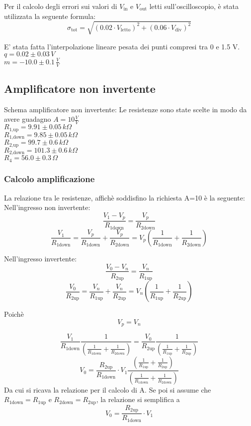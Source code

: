 Per il calcolo degli errori sui valori di $V_\textrm{in}$ e $V_\textrm{out}$ letti sull'oscilloscopio, è stata utilizzata la seguente formula:
$$\sigma_\textrm{tot}=\sqrt{ (0.02\cdot V_\textrm{letto})^2 + (0.06 \cdot V_\textrm{div})^2}$$

E' stata fatta l'interpolazione lineare pesata dei punti compresi tra 0 e 1.5 V.\\
$q = 0.02 \pm 0.03 \,V$\\
$m = -10.0 \pm 0.1 \, \frac{V}{V}$




\subsection{Amplificatore non invertente}

Schema amplificatore non invertente:
Le resistenze sono state scelte in modo da avere guadagno $A=10 \frac{V}{V}$\\
$R_\textrm{1,up}=9.91 \pm0.05 \,k\Omega $\\ %
$R_\textrm{1,down}=9.85 \pm 0.05\,k\Omega$\\ %
$R_\textrm{2,up}=99.7 \pm 0.6\,k\Omega$\\ %
$R_\textrm{2,down}=101.3 \pm 0.6\,k\Omega$\\
$R_4=56.0 \pm 0.3\,\Omega$

\subsubsection{Calcolo amplificazione}
La relazione tra le resistenze, affichè soddisfino la richiesta A=10 è la seguente:
Nell'ingresso non invertente:
$$\frac{V_1-V_p}{R_\textrm{1down}}=\frac{V_p}{R_\textrm{2down}}$$
$$\frac{V_1}{R_\textrm{1down}}=\frac{V_p}{R_\textrm{1down}}+\frac{V_p}{R_\textrm{2down}}=V_p \left(\frac{1}{R_\textrm{1down}}+\frac{1}{R_\textrm{2down}}\right)$$

Nell'ingresso invertente:
$$\frac{V_0-V_n}{R_\textrm{2up}}=\frac{V_n}{R_\textrm{1up}}$$
$$\frac{V_0}{R_\textrm{2up}}=\frac{V_n}{R_\textrm{1up}}+\frac{V_n}{R_\textrm{2up}}=V_n \left(\frac{1}{R_\textrm{1up}}+\frac{1}{R_\textrm{2up}}\right)$$

Poichè 
$$V_p=V_n$$

$$\frac{V_1}{R_\textrm{1down}} \frac{1}{\left(\frac{1}{R_\textrm{1down}}+\frac{1}{R_\textrm{2down} }\right)}=\frac{V_0}{R_\textrm{2up}} \frac{1}{\left(\frac{1}{R_\textrm{1up}}+\frac{1}{R_\textrm{2up}} \right)}$$
$$V_0=\frac{R_\textrm{2up}}{R_\textrm{1down}} \cdot V_1 \frac{\left(\frac{1}{R_\textrm{1up}}+\frac{1}{R_\textrm{2up} }\right)}{\left(\frac{1}{R_\textrm{1down}}+\frac{1}{R_\textrm{2down}} \right)}$$
Da cui si ricava la relazione per il calcolo di A.
Se poi si assume che $R_\textrm{1down}=R_\textrm{1up}$ e $R_\textrm{2down}=R_\textrm{2up}$, la relazione si semplifica a 
$$V_0=\frac{R_\textrm{2up}}{R_\textrm{1down}} \cdot V_1$$
